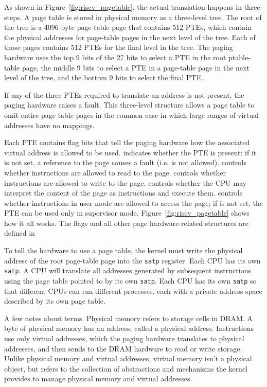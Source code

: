 As shown in
Figure~\ref{fig:riscv_pagetable},
the actual translation happens in three steps.  A page table is stored
in physical memory as a three-level tree.
The root of the tree is a
4096-byte page-table page that contains 512 PTEs, which contain the physical
addresses for page-table pages in the next level of the tree.  Each of those
pages contains 512 PTEs for the final level in the tree.  The paging
hardware uses the top 9 bits of the 27 bits to select a PTE in the
root ptable-table page, the middle 9 bits to select a PTE in a page-table page in the
next level of the
tree, and the bottom 9 bits to select the final PTE.

If any of the three PTEs required to translate an address
is not present, the paging hardware raises a fault.
This three-level structure allows a page table to omit entire page
table pages in the common case in which large ranges of virtual
addresses have no mappings.

Each PTE contains flag bits that tell the paging hardware
how the associated virtual address is allowed to be used.
indicates whether the PTE is present: if it is
not set, a reference to the page causes a fault (i.e. is not allowed).
controls whether instructions are allowed to 
read to the page.
controls whether instructions are allowed to 
write to the page.
controls whether the CPU may interpret the content
of the page as instructions and execute them.
controls whether instructions in user mode are allowed
to access the page;
if  is not set, the PTE can be used only in supervisor mode.
Figure~\ref{fig:riscv_pagetable}
shows how it all works.
The flags and all other page hardware-related structures are defined in

To tell the hardware to use a page table, the kernel must
write the physical address of the root page-table page into the 
\texttt{satp} register.
Each CPU has its own
\texttt{satp}.
A CPU will translate all addresses generated by subsequent instructions
using the page table pointed to by its own \texttt{satp}.
Each CPU has its own \texttt{satp} so that different CPUs can run
different processes, each with a private address space described by
its own page table.

A few notes about terms.
Physical memory refers to storage cells in DRAM.
A byte of physical memory has an address, called a physical address.
Instructions use only virtual addresses, which the
paging hardware translates to physical addresses, and then
sends to the DRAM hardware to read or write storage.
Unlike physical memory and virtual addresses, virtual memory isn't a physical object, but refers to the collection of abstractions and mechanisms
the kernel provides to manage physical memory and virtual
addresses.

